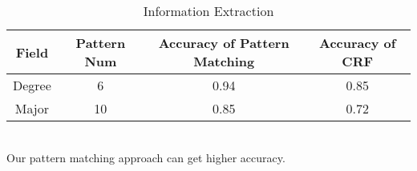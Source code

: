 \begin{table}[ht]
\caption{Information Extraction} %
\centering %
\begin{tabular}{   | c | c | c | c |   }
 \hline
          Field   & Pattern Num & Accuracy of Pattern Matching  & Accuracy of CRF   \\
 \hline
          Degree  & 6           & 0.94       &  0.85  \\
 \hline
          Major   & 10          & 0.85       &  0.72  \\
 \hline

\end{tabular}
\label{tab:ieaccura} %
\\Our pattern matching approach can get higher accuracy.
\end{table}
